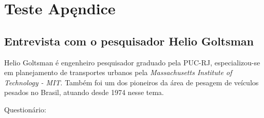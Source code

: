 \documentclass{ufscThesis}
\begin{document}




\apendice
\chapter{Teste Apęndice}
\section{Entrevista com o pesquisador Helio Goltsman}

Helio Goltsman é engenheiro pesquisador graduado pela PUC-RJ, especializou-se em planejamento de transportes urbanos pela \textit{Massachusetts Institute of Technology - MIT}. Também foi um dos pioneiros da área de pesagem de veículos pesados no Brasil, atuando desde 1974 nesse tema.

Questionário:
\end{document}
